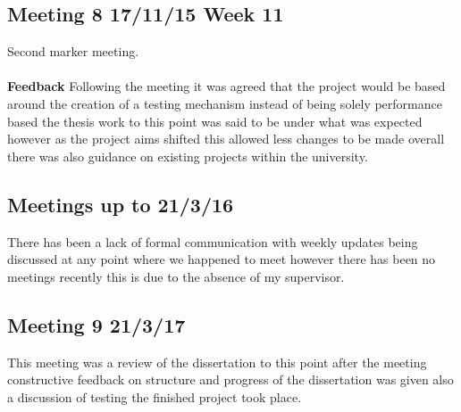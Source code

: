 \subsection{Meeting 8 17/11/15 Week 11}
Second marker meeting.\\\\
\textbf{Feedback}
Following the meeting it was agreed that the project would be based around the creation of a testing mechanism instead of being solely performance based the thesis work to this point was said to be under what was expected however as the project aims shifted this allowed less changes to be made overall there was also guidance on existing projects within the university.


\subsection{Meetings up to 21/3/16}
There has been a lack of formal communication with weekly updates being discussed at any point where we happened to meet however there has been no meetings recently this is due to the absence of my supervisor.    

\subsection{Meeting 9 21/3/17}
This meeting was a review of the dissertation to this point after the meeting constructive feedback on structure and progress of the dissertation was given also a discussion of testing the finished project took place.  